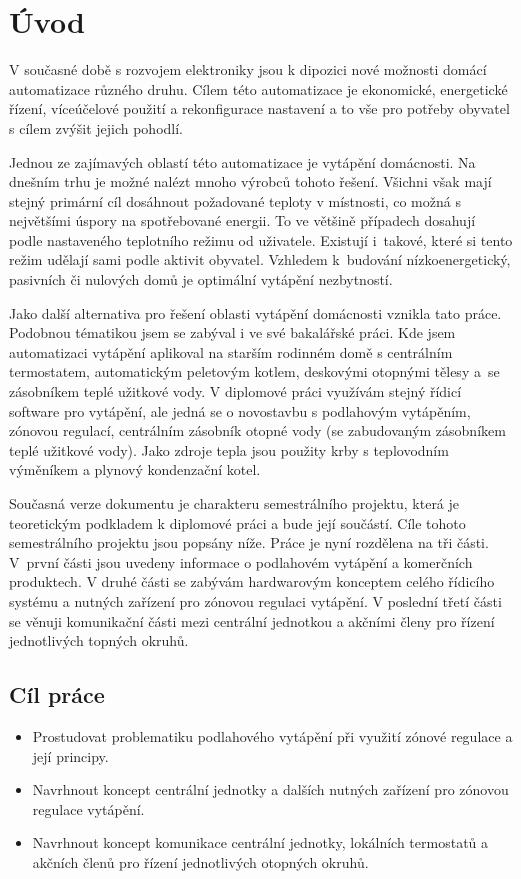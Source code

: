 \chapter{Úvod}

V současné době s rozvojem elektroniky jsou k dipozici nové možnosti domácí automatizace různého druhu. Cílem této automatizace je ekonomické, energetické řízení, víceúčelové použití a rekonfigurace nastavení a to vše pro potřeby obyvatel s cílem zvýšit jejich pohodlí.


Jednou ze zajímavých oblastí této automatizace je vytápění domácnosti. Na dnešním trhu je možné nalézt mnoho výrobců tohoto řešení. Všichni však mají stejný primární cíl dosáhnout požadované teploty v místnosti, co možná s největšími úspory na spotřebované energii. To ve většině případech dosahují podle nastaveného teplotního režimu od uživatele. Existují i~takové, které si tento režim udělají sami podle aktivit obyvatel. Vzhledem k~budování nízkoenergetický, pasivních či nulových domů je optimální vytápění nezbytností.

Jako další alternativa pro řešení oblasti vytápění domácnosti vznikla tato práce. Podobnou tématikou jsem se zabýval i ve své bakalářské práci. Kde jsem automatizaci vytápění aplikoval na starším rodinném domě s centrálním termostatem, automatickým peletovým kotlem, deskovými otopnými tělesy a~se zásobníkem teplé užitkové vody. V diplomové práci využívám stejný řídicí software pro vytápění, ale jedná se o novostavbu s podlahovým vytápěním, zónovou regulací, centrálním zásobník otopné vody (se zabudovaným zásobníkem teplé užitkové vody). Jako zdroje tepla jsou použity krby s teplovodním výměníkem a plynový kondenzační kotel.

Současná verze dokumentu je charakteru semestrálního projektu, která je teoretickým podkladem k diplomové práci a bude její součástí. Cíle tohoto semestrálního projektu jsou popsány níže. Práce je nyní rozdělena na tři části. V~první části jsou uvedeny informace o podlahovém vytápění a komerčních produktech. V druhé části se zabývám hardwarovým konceptem celého řídicího systému a nutných zařízení pro zónovou regulaci vytápění. V poslední třetí části se věnuji komunikační části mezi centrální jednotkou a akčními členy pro řízení jednotlivých topných okruhů.

\section{Cíl práce}
\begin{itemize}
\item Prostudovat problematiku podlahového vytápění při využití zónové regulace a její principy.
\item Navrhnout koncept centrální jednotky a dalších nutných zařízení pro zónovou regulace vytápění.
\item Navrhnout koncept komunikace centrální jednotky, lokálních termostatů a akčních členů pro řízení jednotlivých otopných okruhů.
\end{itemize}
